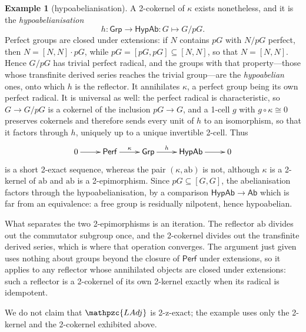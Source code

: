 \documentclass[reqno,a4paper]{amsart}
\numberwithin{equation}{section}
\theoremstyle{plain}
\theoremstyle{definition}
\newtheorem{example}[subsection]{Example}
\def\dfn#1{{\itshape #1}}
\newcommand{\comp}{\circ}
\newcommand{\iso}{\cong}
\newcommand{\catfont}[1]{\ensuremath{\mathpzc{#1}}\xspace}
\newcommand{\onecat}[1]{\ensuremath{\mathsf{#1}}\xspace}
\newcommand{\LAdj}{\catfont{LAdj}}
\renewcommand{\1}{\onecat{1}}
\newcommand{\Grp}{\onecat{Grp}}
\newcommand{\Ab}{\onecat{Ab}}
\newcommand{\Perf}{\onecat{Perf}}
\newcommand{\HypAb}{\onecat{HypAb}}
\begin{document}
\begin{example}[hypoabelianisation]
	A 2-cokernel of \(\kappa\) exists nonetheless, and it is the \dfn{hypoabelianisation}
	\[
		h\colon\Grp\to\HypAb\colon G\mapsto G/pG\text{.}
	\]
	Perfect groups are closed under extensions: if \(N\) contains \(pG\) with \(N/pG\) perfect, then \(N=[N,N]\cdot pG\), while \(pG=[pG,pG]\subseteq[N,N]\), so that \(N=[N,N]\). Hence \(G/pG\) has trivial perfect radical, and the groups with that property---those whose transfinite derived series reaches the trivial group---are the \dfn{hypoabelian} ones, onto which \(h\) is the reflector. It annihilates \(\kappa\), a perfect group being its own perfect radical. It is universal as well: the perfect radical is characteristic, so \(G\to G/pG\) is a cokernel of the inclusion \(pG\to G\), and a 1-cell \(g\) with \(g\comp\kappa\iso 0\) preserves cokernels and therefore sends every unit of \(h\) to an isomorphism, so that it factors through \(h\), uniquely up to a unique invertible 2-cell. Thus
	\[
		\xymatrix{0 \ar[r] & \Perf \ar[r]^-{\kappa} & \Grp \ar[r]^-{h} & \HypAb \ar[r] & 0}
	\]
	is a short 2-exact sequence, whereas the pair \((\kappa,\mathrm{ab})\) is not, although \(\kappa\) is a 2-kernel of \(\mathrm{ab}\) and \(\mathrm{ab}\) is a 2-epimorphism. Since \(pG\subseteq[G,G]\), the abelianisation factors through the hypoabelianisation, by a comparison \(\HypAb\to\Ab\) which is far from an equivalence: a free group is residually nilpotent, hence hypoabelian.

	What separates the two 2-epimorphisms is an iteration. The reflector \(\mathrm{ab}\) divides out the commutator subgroup once, and the 2-cokernel divides out the transfinite derived series, which is where that operation converges. The argument just given uses nothing about groups beyond the closure of \(\Perf\) under extensions, so it applies to any reflector whose annihilated objects are closed under extensions: such a reflector is a 2-cokernel of its own 2-kernel exactly when its radical is idempotent.
\end{example}

We do not claim that \(\LAdj\) is 2-z-exact; the example uses only the 2-kernel and the 2-cokernel exhibited above.
\end{document}
